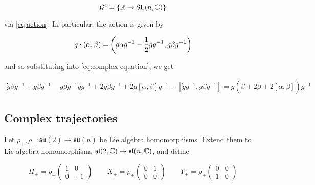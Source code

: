 \documentclass{report}
\newcommand{\su}{\mathfrak{su}}
\renewcommand{\sl}{\mathfrak{sl}}
\begin{document}
\[\mathcal{G}^c = \left\{\mathbb{R} \to \operatorname{SL}(n, \mathbb{C})\right\}\]

via \cref{eq:action}. In particular, the action is given by

\[g \vdot (\alpha, \beta) = \left(g\alpha g^{-1} - \frac{1}{2}\dot g g^{-1}, g\beta g^{-1}\right)\]

and so substituting into \cref{eq:complex-equation}, we get

\begin{align*}
    \dot g \beta g^{-1} + g\dot\beta g^{-1} - g\beta g^{-1}\dot g g^{-1} + 2 g\beta g^{-1} + 2 g[\alpha, \beta]g^{-1} - [\dot g g^{-1}, g\beta g^{-1}] = g\left(\dot\beta + 2\beta + 2[\alpha,\beta]\right)g^{-1}
\end{align*}

\subsection{Complex trajectories}

Let \(\rho_+, \rho_- : \su(2) \to \su(n)\) be Lie algebra homomorphisms. Extend them to Lie algebra homomorphisms \(\sl(2, \C) \to \sl(n, \C)\), and define

\[H_{\pm} = \rho_\pm\begin{pmatrix}
    1 & 0 \\
    0 & -1
\end{pmatrix} \qquad X_\pm = \rho_\pm \begin{pmatrix}
    0 & 1 \\
    0 & 0
\end{pmatrix} \qquad Y_\pm = \rho_\pm \begin{pmatrix}
    0 & 0 \\
    1 & 0
\end{pmatrix}\]
\end{document}

